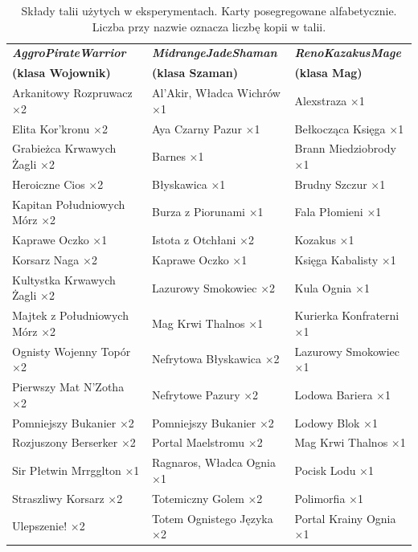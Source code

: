 \begin{table}[p]
\centering
\small
\caption{Składy talii użytych w eksperymentach. Karty posegregowane alfabetycznie. Liczba przy nazwie oznacza liczbę kopii w talii.}
\label{tab:decklists}
\begin{tabular}{p{4.8cm} p{4.8cm} p{4.8cm}}
\toprule
\textbf{\textit{AggroPirateWarrior}} & \textbf{\textit{MidrangeJadeShaman}} & \textbf{\textit{RenoKazakusMage}} \\
\textbf{(klasa Wojownik)} & \textbf{(klasa Szaman)} & \textbf{(klasa Mag)} \\
\midrule
Arkanitowy Rozpruwacz ×2        & Al'Akir, Władca Wichrów ×1   & Alexstraza ×1 \\
Elita Kor'kronu ×2              & Aya Czarny Pazur ×1          & Bełkocząca Księga ×1 \\
Grabieżca Krwawych Żagli ×2     & Barnes ×1                    & Brann Miedziobrody ×1 \\
Heroiczne Cios ×2               & Błyskawica ×1                & Brudny Szczur ×1 \\
Kapitan Południowych Mórz ×2    & Burza z Piorunami ×1         & Fala Płomieni ×1 \\
Kaprawe Oczko ×1                & Istota z Otchłani ×2         & Kozakus ×1 \\
Korsarz Naga ×2                 & Kaprawe Oczko ×1             & Księga Kabalisty ×1 \\
Kultystka Krwawych Żagli ×2     & Lazurowy Smokowiec ×2        & Kula Ognia ×1 \\
Majtek z Południowych Mórz ×2   & Mag Krwi Thalnos ×1          & Kurierka Konfraterni ×1 \\
Ognisty Wojenny Topór ×2        & Nefrytowa Błyskawica ×2      & Lazurowy Smokowiec ×1 \\
Pierwszy Mat N'Zotha ×2         & Nefrytowe Pazury ×2          & Lodowa Bariera ×1 \\
Pomniejszy Bukanier ×2          & Pomniejszy Bukanier ×2       & Lodowy Blok ×1 \\
Rozjuszony Berserker ×2         & Portal Maelstromu ×2         & Mag Krwi Thalnos ×1 \\
Sir Płetwin Mrrgglton ×1        & Ragnaros, Władca Ognia ×1    & Pocisk Lodu ×1 \\
Straszliwy Korsarz ×2           & Totemiczny Golem ×2          & Polimorfia ×1 \\
Ulepszenie! ×2                  & Totem Ognistego Języka ×2    & Portal Krainy Ognia ×1 \\

\end{tabular}
\end{table}
